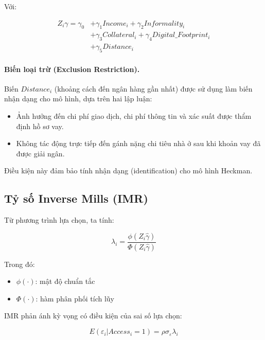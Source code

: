 \documentclass[12pt,a4paper]{report}
\begin{document}
Với:

\begin{equation}
	\begin{aligned}
		Z_i \gamma = \gamma_0 
		&+ \gamma_1 Income_i
		+ \gamma_2 Informality_i \\
		&+ \gamma_3 Collateral_i
		+ \gamma_4 Digital\_Footprint_i \\
		&+ \gamma_5 Distance_i
	\end{aligned}
\end{equation}

\paragraph{Biến loại trừ (Exclusion Restriction).}

Biến $Distance_i$ (khoảng cách đến ngân hàng gần nhất) được sử dụng làm biến nhận dạng cho mô hình, dựa trên hai lập luận:

\begin{itemize}
	\item Ảnh hưởng đến chi phí giao dịch, chi phí thông tin và xác suất được thẩm định hồ sơ vay.
	\item Không tác động trực tiếp đến gánh nặng chi tiêu nhà ở sau khi khoản vay đã được giải ngân.
\end{itemize}

Điều kiện này đảm bảo tính nhận dạng (identification) cho mô hình Heckman.


\subsection{Tỷ số Inverse Mills (IMR)}

Từ phương trình lựa chọn, ta tính:

\begin{equation}
	\lambda_i =
	\frac{\phi(Z_i \hat{\gamma})}
	{\Phi(Z_i \hat{\gamma})}
\end{equation}

Trong đó:

\begin{itemize}
	\item $\phi(\cdot)$: mật độ chuẩn tắc
	\item $\Phi(\cdot)$: hàm phân phối tích lũy
\end{itemize}

IMR phản ánh kỳ vọng có điều kiện của sai số lựa chọn:

\begin{equation}
	E(\varepsilon_i | Access_i=1) = \rho \sigma_\varepsilon \lambda_i
\end{equation}
\end{document}
